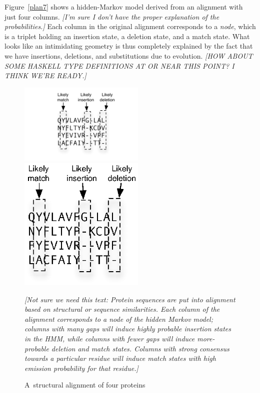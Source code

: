 \documentclass[preprint,nonatbib,blockstyle,nocopyrightspace,times]{sigplanconf}
\newcommand\figref[1]{Figure~\ref{#1}}
\begin{document}
\figref{plan7} shows a hidden-Markov model derived from an alignment
with just four columns.
\emph{[I'm sure I don't have the proper explanation of the probabilities.]}
Each column in the original alignment corresponds to a \emph{node},
which is a triplet holding an insertion state, a deletion state, and a
match state.
What looks like an 
intimidating geometry is thus completely explained by the fact that we have 
insertions, deletions, and substitutions due to evolution.
\emph{[HOW ABOUT SOME HASKELL TYPE DEFINITIONS AT OR NEAR THIS POINT?
    I THINK WE'RE READY.]}


\begin{figure}
\ifpdfmadness
\centerline{\includegraphics[width=6cm]{alignment.pdf}} 
\else
\centerline{\includegraphics[width=6cm]{alignment.eps}} 
\fi

\emph{[Not sure we need this text: 
Protein sequences are put into alignment based on structural or 
sequence similarities.
Each column of the alignment corresponds to a node of 
the hidden Markov model; columns with many gaps will induce highly probable 
insertion states in the HMM, while columns with fewer gaps will induce 
more-probable deletion and match states.
Columns with strong consensus towards 
a particular residue will induce match states with high emission probability 
for that residue.]}


\caption{A~structural alignment of four proteins}
\label{alignment} 
\end{figure}
\end{document}

